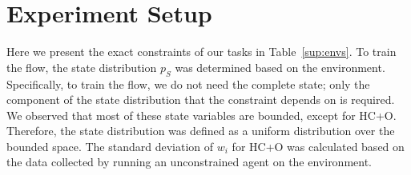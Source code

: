 \section{Experiment Setup}

Here we present the exact constraints of our tasks in Table~\ref{sup:envs}. To train the flow, the state distribution $p_S$ was determined based on the environment. Specifically, to train the flow, we do not need the complete state; only the component of the state distribution that the constraint depends on is required. We observed that most of these state variables are bounded, except for HC+O. Therefore, the state distribution was defined as a uniform distribution over the bounded space. The standard deviation of $w_i$ for HC+O was calculated based on the data collected by running an unconstrained agent on the environment.

